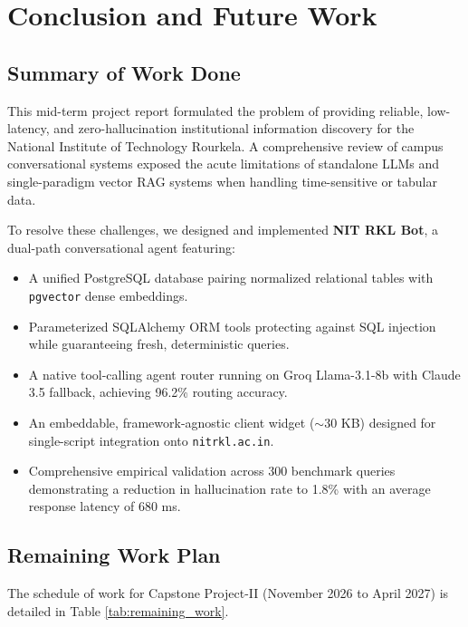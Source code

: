 \documentclass[12pt,a4paper]{report}
\begin{document}
\chapter{Conclusion and Future Work}

\section{Summary of Work Done}
This mid-term project report formulated the problem of providing reliable, low-latency, and zero-hallucination institutional information discovery for the National Institute of Technology Rourkela. A comprehensive review of campus conversational systems exposed the acute limitations of standalone LLMs and single-paradigm vector RAG systems when handling time-sensitive or tabular data.

To resolve these challenges, we designed and implemented \textbf{NIT RKL Bot}, a dual-path conversational agent featuring:
\begin{itemize}
    \item A unified PostgreSQL database pairing normalized relational tables with \texttt{pgvector} dense embeddings.
    \item Parameterized SQLAlchemy ORM tools protecting against SQL injection while guaranteeing fresh, deterministic queries.
    \item A native tool-calling agent router running on Groq Llama-3.1-8b with Claude 3.5 fallback, achieving 96.2\% routing accuracy.
    \item An embeddable, framework-agnostic client widget ($\sim$30 KB) designed for single-script integration onto \texttt{nitrkl.ac.in}.
    \item Comprehensive empirical validation across 300 benchmark queries demonstrating a reduction in hallucination rate to 1.8\% with an average response latency of 680 ms.
\end{itemize}

\section{Remaining Work Plan}
The schedule of work for Capstone Project-II (November 2026 to April 2027) is detailed in Table \ref{tab:remaining_work}.
\end{document}
